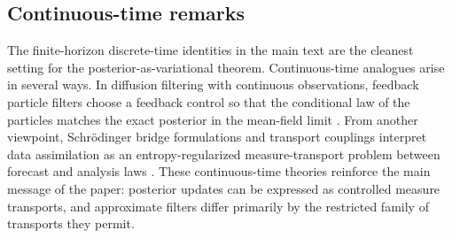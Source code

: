 \documentclass[11pt]{article}
\numberwithin{equation}{section}
\theoremstyle{plain}
\theoremstyle{definition}
\theoremstyle{remark}
\begin{document}
\subsection{Continuous-time remarks}

The finite-horizon discrete-time identities in the main text are the cleanest setting for the posterior-as-variational theorem. Continuous-time analogues arise in several ways. In diffusion filtering with continuous observations, feedback particle filters choose a feedback control so that the conditional law of the particles matches the exact posterior in the mean-field limit \citep{yang2013}. From another viewpoint, Schr\"odinger bridge formulations and transport couplings interpret data assimilation as an entropy-regularized measure-transport problem between forecast and analysis laws \citep{reich2019}. These continuous-time theories reinforce the main message of the paper: posterior updates can be expressed as controlled measure transports, and approximate filters differ primarily by the restricted family of transports they permit.




\end{document}
